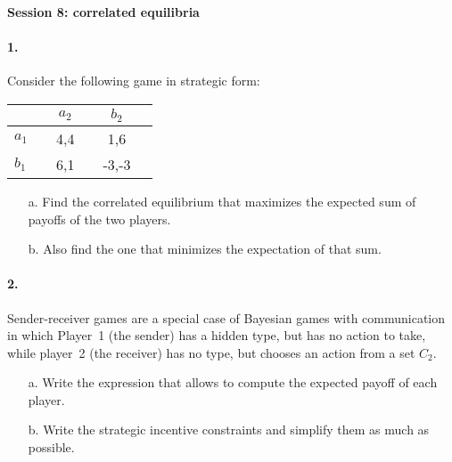 \documentclass[a4paper,notitlepage,12pt]{article}
\begin{document}
\setlength{\parindent}{0pt}
\setlength{\parskip}{1ex plus 0.5ex minus 0.2ex}

\large

\textbf{Session 8: correlated equilibria}


\paragraph{1. } Consider the following game in strategic form:

	\begin{center}
		\begin{tabular}[h!]{l|ccccc}
			&& $a_2$ && $b_2$ & \\
			\hline
			$a_1$ && 4,4 && 1,6 & \\
			$b_1$ && 6,1 && -3,-3 & 
		\end{tabular} 
	\end{center}

\begin{enumerate}
	\item[a.] Find the correlated equilibrium that maximizes the expected sum of payoffs of the two players.
	\item[b.] Also find the one that minimizes the expectation of that sum.
\end{enumerate}

\begin{solution}

\end{solution}

\paragraph{2. } Sender-receiver games are a special case of Bayesian games with communication in which Player~1 (the sender) has a hidden type, but has no action to take, while player~2 (the receiver) has no type, but chooses an action from a set $C_2$.

\begin{enumerate}
	\item[a.] Write the expression that allows to compute the expected payoff of each player.
	\item[b.] Write the strategic incentive constraints and simplify them as much as possible.
\end{enumerate}
\end{document}
